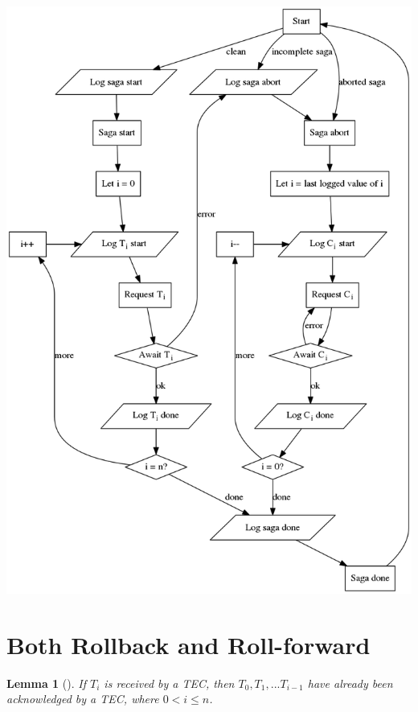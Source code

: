 \documentclass{article}
\newtheorem{lemma}[theorem]{Lemma}
\begin{document}
\includegraphics[width=\linewidth]{flow}




\section{Both Rollback and Roll-forward}

\begin{lemma}[]
\label{t_contiguous}
If $T_i$ is received by a TEC, then $T_0, T_1, ... T_{i-1}$ have already been
acknowledged by a TEC, where $0 < i \le n$.
\end{lemma}
\end{document}
